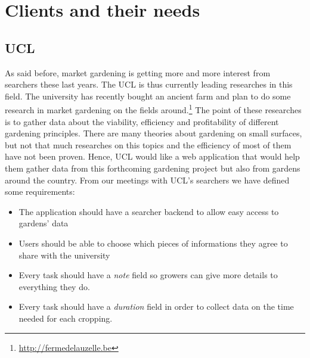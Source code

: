 
\section{Clients and their needs}

\subsection{UCL}
As said before, market gardening is getting more and more interest from searchers these last years. The UCL is thus currently leading researches in this field. The university has recently bought an ancient farm and plan to do some research in market gardening on the fields around.\footnote{\url{http://fermedelauzelle.be}} The point of these researches is to gather data about the viability, efficiency and profitability of different gardening principles. There are many theories about gardening on small surfaces, but not that much researches on this topics and the efficiency of most of them have not been proven.
Hence, UCL would like a web application that would help them gather data from this forthcoming gardening project but also from gardens around the country.
From our meetings with UCL's searchers we have defined some requirements:
\begin{itemize}
\item The application should have a searcher backend to allow easy access to gardens' data
\item Users should be able to choose which pieces of informations they agree to share with the university
\item Every task should have a \emph{note} field so growers can give more details to everything they do.
\item Every task should have a \emph{duration} field in order to collect data on the time needed for each cropping.
\end{itemize}
